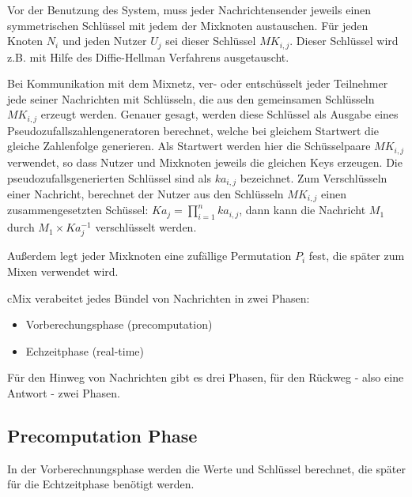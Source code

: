 \documentclass[
    fontsize=12pt,
    headings=small,
    parskip=half,           %
    bibliography=totoc,
    numbers=noenddot,       %
    open=any,               %
    ]{scrreprt}
\begin{document}
Vor der Benutzung des System, muss jeder Nachrichtensender jeweils einen symmetrischen Schlüssel mit jedem der Mixknoten austauschen.
Für jeden Knoten $N_i$ und jeden Nutzer $U_j$ sei dieser Schlüssel $MK_{i,j}$.
Dieser Schlüssel wird z.B. mit Hilfe des Diffie-Hellman Verfahrens ausgetauscht.

Bei Kommunikation mit dem Mixnetz, ver- oder entschüsselt jeder Teilnehmer jede seiner Nachrichten mit Schlüsseln, die aus den gemeinsamen Schlüsseln \(MK_{i,j}\) erzeugt werden.
Genauer gesagt, werden diese Schlüssel als Ausgabe eines Pseudozufallszahlengeneratoren berechnet, welche bei gleichem Startwert die gleiche Zahlenfolge generieren.
Als Startwert werden hier die Schüsselpaare \(MK_{i,j}\) verwendet, so dass Nutzer und Mixknoten jeweils die gleichen Keys erzeugen.
Die pseudozufallsgenerierten Schlüssel sind als \(ka_{i,j}\) bezeichnet.
Zum Verschlüsseln einer Nachricht, berechnet der Nutzer aus den Schlüsseln \(MK_{i,j}\)
einen zusammengesetzten Schüssel: \(Ka_j = \prod_{i=1}^{n} ka_{i,j}\),
dann kann die Nachricht \(M_1\) durch \(M_1 \times Ka_{j}^{-1}\) verschlüsselt werden.

Außerdem legt jeder Mixknoten eine zufällige Permutation $P_i$ fest, die später zum Mixen verwendet wird.

cMix verabeitet jedes Bündel von Nachrichten in zwei Phasen:
\begin{itemize}
	\item Vorberechungsphase (precomputation)
	\item Echzeitphase (real-time)
\end{itemize}

Für den Hinweg von Nachrichten gibt es drei Phasen,
für den Rückweg - also eine Antwort - zwei Phasen.


\subsection{Precomputation Phase}

In der Vorberechnungsphase werden die Werte und Schlüssel berechnet, die später für die Echtzeitphase benötigt werden.
\end{document}
